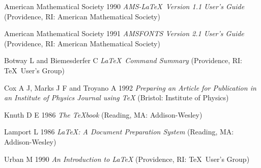 \References

\begin{thereferences}

\item[] American Mathematical Society 1990 {\it AMS-\LaTeX\ Version 1.1
User's Guide} (Providence, RI: American Mathematical Society)

\item[] American Mathematical Society 1991 {\it AMSFONTS Version 2.1
User's Guide} (Providence, RI: American Mathematical Society)



\item[] Botway L and Biemesderfer C 
{\it \LaTeX\ Command Summary} (Providence, RI:
\TeX\ User's Group)                  


\item[] Cox A J, Marks J F and Troyano A 1992 {\it Preparing an 
Article for Publication in 
an Institute of Physics Journal using \TeX} (Bristol: Institute of Physics)

\item[] Knuth D E 1986 {\it The \TeX book} (Reading, MA: Addison-Wesley)

\item[] Lamport L 1986 {\it \LaTeX: A Document Preparation System} (Reading, MA: Addison-Wesley)

\item[] Urban M 1990 {\it An Introduction to \LaTeX} (Providence, RI:
\TeX\ User's Group)

\end{thereferences}
\begin{theindex}

\end{theindex}


 
